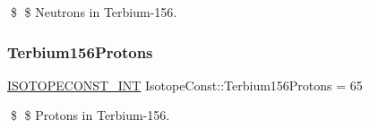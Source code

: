 \$ \$ Neutrons in Terbium-\/156. \mbox{\label{group___isotope_const-_terbium-_tb156_ga0bf8760d28d5c3d754f772935f3480ee}} 
\subsubsection{\texorpdfstring{Terbium156\+Protons}{Terbium156Protons}}
{\footnotesize\ttfamily \mbox{\hyperlink{group___isotope_const-_macros_ga5f18360b3e99483a35c32d789e62621c}{I\+S\+O\+T\+O\+P\+E\+C\+O\+N\+S\+T\+\_\+\+I\+NT}} Isotope\+Const\+::\+Terbium156\+Protons = 65}

\$ \$ Protons in Terbium-\/156. 